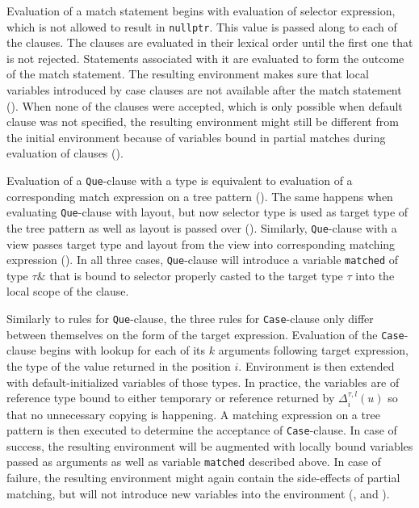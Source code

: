 \documentclass[preprint]{sigplanconf}
\makeatletter
\DeclareRobustCommand{\code}[1]{{\lstinline[breaklines=false,escapechar=@]{#1}}}
\makeatother
\begin{document}
Evaluation of a match statement begins with evaluation of selector expression, 
which is not allowed to result in \code{nullptr}. This value is passed along to 
each of the clauses. The clauses are evaluated in their lexical order until the
first one that is not rejected. Statements associated with it are evaluated to 
form the outcome of the match statement. The resulting environment makes sure 
that local variables introduced by case clauses are not available after the 
match statement (). When none of the clauses were 
accepted, which is only possible when default clause was not specified, the 
resulting environment might still be different from the initial environment 
because of variables bound in partial matches during evaluation of clauses 
().

Evaluation of a \code{Que}-clause with a type is equivalent to evaluation of a 
corresponding match expression on a tree pattern (). The 
same happens when evaluating \code{Que}-clause with layout, but now selector 
type is used as target type of the tree pattern as well as layout is passed 
over (). Similarly, \code{Que}-clause with a view passes 
target type and layout from the view into corresponding matching expression 
(). In all three cases, \code{Que}-clause will introduce a 
variable \code{matched} of type $\tau\&$ that is bound to selector properly 
casted to the target type $\tau$ into the local scope of the clause.

Similarly to rules for \code{Que}-clause, the three rules for \code{Case}-clause 
only differ between themselves on the form of the target expression. Evaluation 
of the \code{Case}-clause begins with lookup for each of its $k$ arguments 
following target expression, the type of the value returned in the position $i$. 
Environment is then extended with default-initialized variables of those types. 
In practice, the variables are of reference type bound to either temporary or 
reference returned by $\Delta_i^{\tau,l}(u)$ so that no unnecessary copying is 
happening. A matching expression on a tree pattern is then executed to determine 
the acceptance of \code{Case}-clause. In case of success, the resulting 
environment will be augmented with locally bound variables passed as arguments 
as well as variable \code{matched} described above. In case of failure, the 
resulting environment might again contain the side-effects of partial matching, 
but will not introduce new variables into the environment (, 
 and ).
\end{document}
